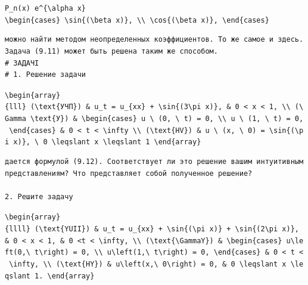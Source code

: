 \documentclass[
  ukrainian,
]{article}
\begin{document}
\texttt{P\_n(x)\ e\^{}\{\textbackslash{}alpha\ x\}}
\texttt{\textbackslash{}begin\{cases\}\ \textbackslash{}sin\{(\textbackslash{}beta\ x)\},\ \textbackslash{}\textbackslash{}\ \textbackslash{}cos\{(\textbackslash{}beta\ x)\},\ \textbackslash{}end\{cases\}}

\begin{verbatim}
можно найти методом неопределенных коэффициентов. То же самое и здесь. Задача (9.11) может быть решена таким же способом.
# ЗАДАЧІ
# 1. Решение задачи
\end{verbatim}

\texttt{\textbackslash{}begin\{array\}\{lll\}\ (\textbackslash{}text\{УЧП\})\ \&\ u\_t\ =\ u\_\{xx\}\ +\ \textbackslash{}sin\{(3\textbackslash{}pi\ x)\},\ \&\ 0\ \textless{}\ x\ \textless{}\ 1,\ \textbackslash{}\textbackslash{}\ (\textbackslash{}Gamma\ \textbackslash{}text\{У\})\ \&\ \textbackslash{}begin\{cases\}\ u\ \textbackslash{}\ (0,\ \textbackslash{}\ t)\ =\ 0,\ \textbackslash{}\textbackslash{}\ u\ \textbackslash{}\ (1,\ \textbackslash{}\ t)\ =\ 0,\ \textbackslash{}end\{cases\}\ \&\ 0\ \textless{}\ t\ \textless{}\ \textbackslash{}infty\ \textbackslash{}\textbackslash{}\ (\textbackslash{}text\{HV\})\ \&\ u\ \textbackslash{}\ (x,\ \textbackslash{}\ 0)\ =\ \textbackslash{}sin\{(\textbackslash{}pi\ x)\},\ \textbackslash{}\ 0\ \textbackslash{}leqslant\ x\ \textbackslash{}leqslant\ 1\ \textbackslash{}end\{array\}}

\begin{verbatim}
дается формулой (9.12). Соответствует ли это решение вашим интуитивным представлениям? Что представляет собой полученное решение?

2. Решите задачу
\end{verbatim}

\texttt{\textbackslash{}begin\{array\}\{llll\}\ (\textbackslash{}text\{YUII\})\ \&\ u\_t\ =\ u\_\{xx\}\ +\ \textbackslash{}sin\{(\textbackslash{}pi\ x)\}\ +\ \textbackslash{}sin\{(2\textbackslash{}pi\ x)\},\ \&\ 0\ \textless{}\ x\ \textless{}\ 1,\ \&\ 0\ \textless{}t\ \textless{}\ \textbackslash{}infty,\ \textbackslash{}\textbackslash{}\ (\textbackslash{}text\{\textbackslash{}GammaY\})\ \&\ \textbackslash{}begin\{cases\}\ u\textbackslash{}left(0,\textbackslash{}\ t\textbackslash{}right)\ =\ 0,\ \textbackslash{}\textbackslash{}\ u\textbackslash{}left(1,\textbackslash{}\ t\textbackslash{}right)\ =\ 0,\ \textbackslash{}end\{cases\}\ \&\ 0\ \textless{}\ t\ \textless{}\ \textbackslash{}infty,\ \textbackslash{}\textbackslash{}\ (\textbackslash{}text\{HY\})\ \&\ u\textbackslash{}left(x,\textbackslash{}\ 0\textbackslash{}right)\ =\ 0,\ \&\ 0\ \textbackslash{}leqslant\ x\ \textbackslash{}leqslant\ 1.\ \textbackslash{}end\{array\}}
\end{document}
